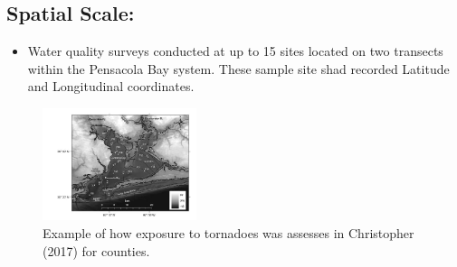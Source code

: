 \documentclass[
]{article}
\providecommand{\tightlist}{%
  \setlength{\itemsep}{0pt}\setlength{\parskip}{0pt}}
\begin{document}
\hypertarget{spatial-scale-2}{%
\subsection{Spatial Scale:}\label{spatial-scale-2}}

\begin{itemize}
\tightlist
\item
  Water quality surveys conducted at up to 15 sites located on two
  transects within the Pensacola Bay system. These sample site shad
  recorded Latitude and Longitudinal coordinates.
\end{itemize}

\begin{figure}

{\centering \includegraphics[width=0.4\textwidth]{figures/pensacola_bay_survey_sites} 

}

\caption{Example of how exposure to tornadoes was assesses in Christopher (2017) for counties.}\label{fig:unnamed-chunk-1}
\end{figure}
\end{document}
